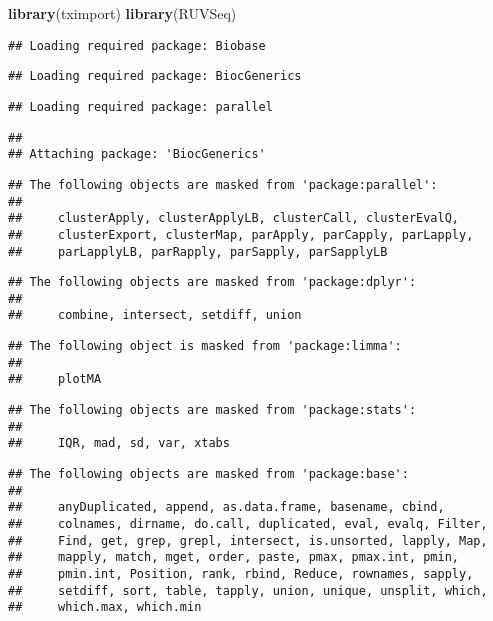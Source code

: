 \documentclass[]{article}
\newenvironment{Shaded}{\begin{snugshade}}{\end{snugshade}}
\newcommand{\KeywordTok}[1]{\textcolor[rgb]{0.13,0.29,0.53}{\textbf{#1}}}
\newcommand{\NormalTok}[1]{#1}
\begin{document}
\begin{Shaded}
\begin{Highlighting}[]
\KeywordTok{library}\NormalTok{(tximport)}
\KeywordTok{library}\NormalTok{(RUVSeq)}
\end{Highlighting}
\end{Shaded}

\begin{verbatim}
## Loading required package: Biobase
\end{verbatim}

\begin{verbatim}
## Loading required package: BiocGenerics
\end{verbatim}

\begin{verbatim}
## Loading required package: parallel
\end{verbatim}

\begin{verbatim}
## 
## Attaching package: 'BiocGenerics'
\end{verbatim}

\begin{verbatim}
## The following objects are masked from 'package:parallel':
## 
##     clusterApply, clusterApplyLB, clusterCall, clusterEvalQ,
##     clusterExport, clusterMap, parApply, parCapply, parLapply,
##     parLapplyLB, parRapply, parSapply, parSapplyLB
\end{verbatim}

\begin{verbatim}
## The following objects are masked from 'package:dplyr':
## 
##     combine, intersect, setdiff, union
\end{verbatim}

\begin{verbatim}
## The following object is masked from 'package:limma':
## 
##     plotMA
\end{verbatim}

\begin{verbatim}
## The following objects are masked from 'package:stats':
## 
##     IQR, mad, sd, var, xtabs
\end{verbatim}

\begin{verbatim}
## The following objects are masked from 'package:base':
## 
##     anyDuplicated, append, as.data.frame, basename, cbind,
##     colnames, dirname, do.call, duplicated, eval, evalq, Filter,
##     Find, get, grep, grepl, intersect, is.unsorted, lapply, Map,
##     mapply, match, mget, order, paste, pmax, pmax.int, pmin,
##     pmin.int, Position, rank, rbind, Reduce, rownames, sapply,
##     setdiff, sort, table, tapply, union, unique, unsplit, which,
##     which.max, which.min
\end{verbatim}
\end{document}
